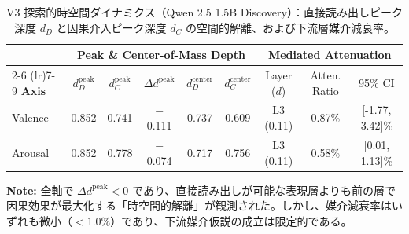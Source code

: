 \begin{table}[htbp]
\centering
\small
\caption{V3 探索的時空間ダイナミクス（Qwen 2.5 1.5B Discovery）：直接読み出しピーク深度 $d_D$ と因果介入ピーク深度 $d_C$ の空間的解離、および下流層媒介減衰率。}
\label{tab:v3_spatiotemporal_dynamics}
\begin{tabular}{l ccccc ccc}
\toprule
 & \multicolumn{5}{c}{\textbf{Peak \& Center-of-Mass Depth}} & \multicolumn{3}{c}{\textbf{Mediated Attenuation}} \\
\cmidrule(lr){2-6} \cmidrule(lr){7-9}
\textbf{Axis} & $d_D^{\text{peak}}$ & $d_C^{\text{peak}}$ & $\Delta d^{\text{peak}}$ & $d_D^{\text{center}}$ & $d_C^{\text{center}}$ & Layer ($d$) & Atten. Ratio & 95\% CI \\
\midrule
Valence    & 0.852    & 0.741    & $-$0.111 & 0.737    & 0.609    & L3 (0.11)    & 0.87\%       & [-1.77, 3.42]\% \\
Arousal    & 0.852    & 0.778    & $-$0.074 & 0.717    & 0.756    & L3 (0.11)    & 0.58\%       & [0.01, 1.13]\% \\
\bottomrule
\end{tabular}
\vspace{1ex}
\begin{minipage}{\linewidth}
\footnotesize
\textbf{Note:} 全軸で $\Delta d^{\text{peak}} < 0$ であり、直接読み出しが可能な表現層よりも前の層で因果効果が最大化する「時空間的解離」が観測された。しかし、媒介減衰率はいずれも微小（$< 1.0\%$）であり、下流媒介仮説の成立は限定的である。
\end{minipage}
\end{table}